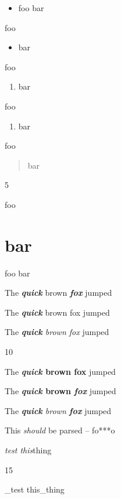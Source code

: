
\def\mytitle{Edge Cases}


\begin{itemize}
\item foo
bar

\end{itemize}

foo

\begin{itemize}
\item bar

\end{itemize}

foo

\begin{enumerate}
\item bar

\end{enumerate}

foo

\begin{enumerate}
\item bar

\end{enumerate}

foo

\begin{quote}
bar
\end{quote}

5

foo

\part{bar}
\label{bar}

foo
bar

The \textbf{\emph{quick}} brown \textbf{\emph{fox}} jumped

The \textbf{\emph{quick}} brown fox jumped

The \emph{\textbf{quick} brown fox} jumped

10

The \textbf{\emph{quick} brown fox} jumped

The \textbf{\emph{quick} brown \emph{fox}} jumped

The \emph{\textbf{quick} brown \textbf{fox}} jumped

This \emph{should} be parsed -- fo***o

\emph{test this}thing

15

\_test this\_thing

